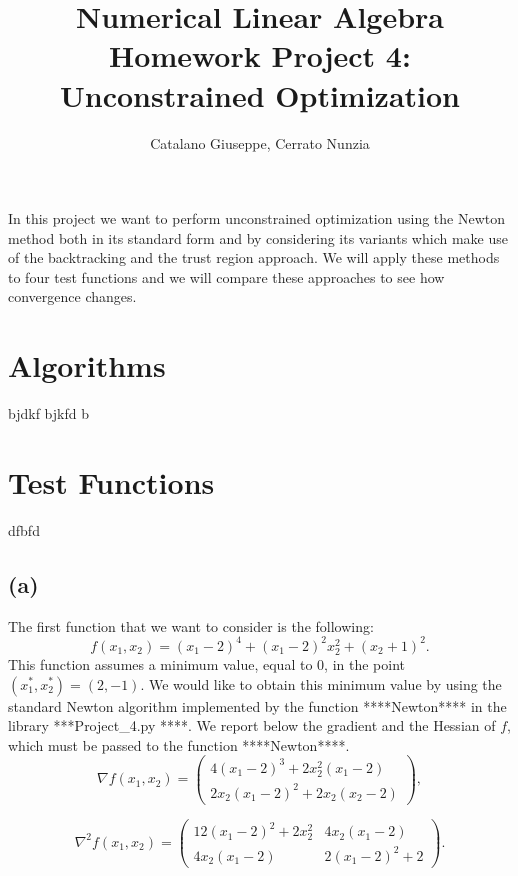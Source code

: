 \documentclass[a4paper,11pt]{article}
\begin{document}
	\author{Catalano Giuseppe, Cerrato Nunzia}
	\title{Numerical Linear Algebra Homework Project 4:\\Unconstrained Optimization}
	\date{}
	\maketitle
	
	In this project we want to perform unconstrained optimization using the Newton method both in its standard form and by considering its variants which make use of the backtracking and the trust region approach. We will apply these methods to four test functions and we will compare these approaches to see how convergence changes.
	
	\section*{Algorithms}
	bjdkf bjkfd b
	\section*{Test Functions}
	dfbfd
	\subsection*{(a)}
	The first function that we want to consider is the following:
	\begin{equation}
		f(x_{1},x_{2}) = (x_{1}-2)^{4} + (x_{1}-2)^{2}x_{2}^{2} + (x_{2}+1)^{2}.
	\end{equation}
	This function assumes a minimum value, equal to $0$, in the point $(x_{1}^*,x_{2}^*)=(2,-1)$. We would like to obtain this minimum value by using the standard Newton algorithm implemented by the function ****Newton**** in the library ***Project\_4.py ****. We report below the gradient and the Hessian of $f$, which must be passed to the function ****Newton****.
	\begin{equation}
		\nabla f(x_{1},x_{2}) = \begin{pmatrix}
			4(x_{1}-2)^{3} + 2x_{2}^{2}(x_{1}-2)\\
			2x_{2}(x_{1}-2)^{2} + 2x_{2}(x_{2}-2)
		\end{pmatrix},
	\end{equation}

		\begin{equation}
		\nabla^{2} f(x_{1},x_{2}) = \begin{pmatrix}
			12(x_{1}-2)^{2} + 2x_{2}^{2} & 4x_{2}(x_{1}-2)\\
			4x_{2}(x_{1}-2) & 2(x_{1}-2)^{2} + 2
		\end{pmatrix}.
	\end{equation}
	
\end{document}
